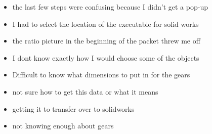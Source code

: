 \begin{itemize}
    \item the last few steps were confusing because I didn't get a pop-up
    \item I had to select the location of the executable for solid works
    \item the ratio picture in the beginning of the packet threw me off
    \item I dont know exactly how I would choose some of the objects
    \item Difficult to know what dimensions to put in for the gears
    \item not sure how to get this data or what it means
    \item getting it to transfer over to solidworks
    \item not knowing enough about gears
\end{itemize}

